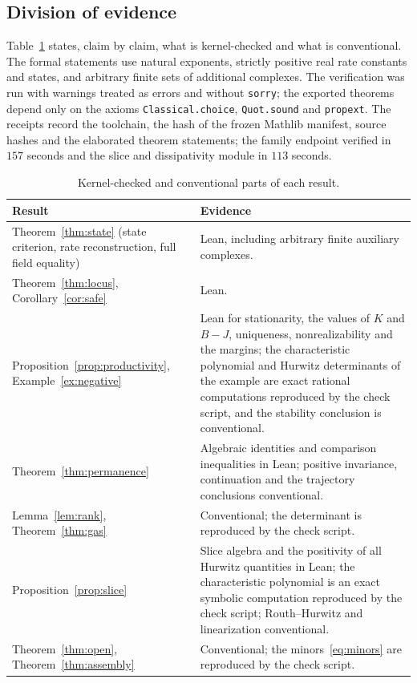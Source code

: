 \documentclass[11pt,a4paper]{article}
\theoremstyle{plain}
\theoremstyle{definition}
\theoremstyle{remark}
\begin{document}
\subsection{Division of evidence}

Table~\ref{tab:coverage} states, claim by claim, what is kernel-checked and what is conventional. The formal statements use natural exponents, strictly positive real rate constants and states, and arbitrary finite sets of additional complexes. The verification was run with warnings treated as errors and without \texttt{sorry}; the exported theorems depend only on the axioms \texttt{Classical.choice}, \texttt{Quot.sound} and \texttt{propext}. The receipts record the toolchain, the hash of the frozen Mathlib manifest, source hashes and the elaborated theorem statements; the family endpoint verified in $157$ seconds and the slice and dissipativity module in $113$ seconds.

\begin{table}[htbp]\centering\small
\caption{Kernel-checked and conventional parts of each result.}\label{tab:coverage}
\begin{tabular}{>{\raggedright\arraybackslash}p{}>{\raggedright\arraybackslash}p{}}\toprule
Result&Evidence\\\midrule
Theorem~\ref{thm:state} (state criterion, rate reconstruction, full field equality)&Lean, including arbitrary finite auxiliary complexes.\\
Theorem~\ref{thm:locus}, Corollary~\ref{cor:safe}&Lean.\\
Proposition~\ref{prop:productivity}, Example~\ref{ex:negative}&Lean for stationarity, the values of $K$ and $B-J$, uniqueness, nonrealizability and the margins; the characteristic polynomial and Hurwitz determinants of the example are exact rational computations reproduced by the check script, and the stability conclusion is conventional.\\
Theorem~\ref{thm:permanence}&Algebraic identities and comparison inequalities in Lean; positive invariance, continuation and the trajectory conclusions conventional.\\
Lemma~\ref{lem:rank}, Theorem~\ref{thm:gas}&Conventional; the determinant is reproduced by the check script.\\
Proposition~\ref{prop:slice}&Slice algebra and the positivity of all Hurwitz quantities in Lean; the characteristic polynomial is an exact symbolic computation reproduced by the check script; Routh--Hurwitz and linearization conventional.\\
Theorem~\ref{thm:open}, Theorem~\ref{thm:assembly}&Conventional; the minors~\eqref{eq:minors} are reproduced by the check script.\\\bottomrule
\end{tabular}
\end{table}
\end{document}
